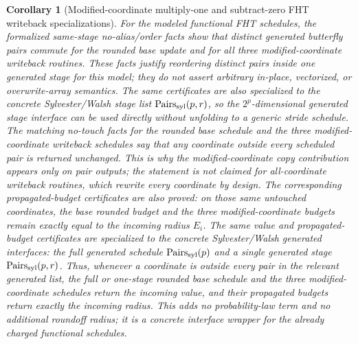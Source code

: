 \documentclass[11pt]{article}
\newtheorem{corollary}[theorem]{Corollary}
\theoremstyle{remark}
\begin{document}
\begin{corollary}[Modified-coordinate multiply-one and subtract-zero FHT writeback specializations]
For the modeled functional FHT schedules, the formalized same-stage
no-alias/order facts show that distinct generated butterfly pairs commute for
the rounded base update and for all three modified-coordinate writeback
routines.  These facts justify reordering distinct pairs inside one
generated stage for this model; they do not assert arbitrary in-place,
vectorized, or overwrite-array semantics.  The same certificates are also
specialized to the concrete Sylvester/Walsh stage list
\(\operatorname{Pairs}_{\rm syl}(p,r)\), so the \(2^p\)-dimensional generated
stage interface can be used directly without unfolding to a generic stride
schedule.
The matching no-touch facts for the rounded base schedule and the three
modified-coordinate writeback schedules say that any coordinate outside every
scheduled pair is returned unchanged.  This is why the
modified-coordinate copy contribution appears only on pair outputs; the
statement is not claimed for all-coordinate writeback routines, which rewrite
every coordinate by design.
The corresponding propagated-budget certificates are also proved: on those
same untouched coordinates, the base rounded budget and the three
modified-coordinate budgets remain exactly equal to the incoming radius \(E_i\).
The same value and propagated-budget certificates are specialized to the
concrete Sylvester/Walsh generated interfaces: the full generated schedule
\(\operatorname{Pairs}_{\rm syl}(p)\) and a single generated stage
\(\operatorname{Pairs}_{\rm syl}(p,r)\).  Thus, whenever a coordinate is outside
every pair in the relevant generated list, the full or one-stage rounded base
schedule and the three modified-coordinate schedules return the incoming value,
and their propagated budgets return exactly the incoming radius.  This adds no
probability-law term and no additional roundoff radius; it is a concrete
interface wrapper for the already charged functional schedules.
\end{corollary}
\end{document}
